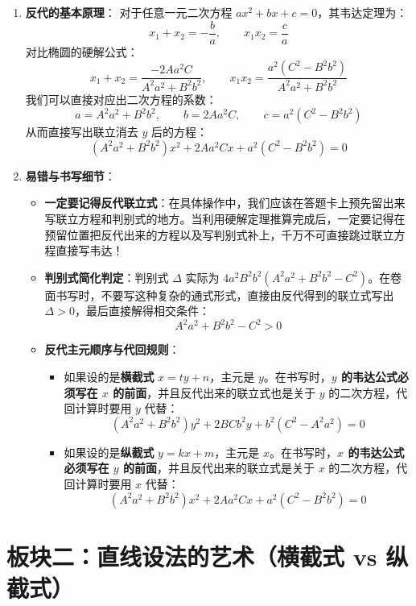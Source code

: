 \documentclass[11pt,a4paper]{ctexart}
\begin{document}
\begin{enumerate}[label=\arabic*.]
  \item \textbf{反代的基本原理}：
        对于任意一元二次方程 $ax^2 + bx + c = 0$，其韦达定理为：
        \[ x_1 + x_2 = -\frac{b}{a},\qquad x_1x_2 = \frac{c}{a} \]
        对比椭圆的硬解公式：
        \[ x_1 + x_2 = \frac{-2Aa^2C}{A^2a^2 + B^2b^2},\qquad x_1x_2 = \frac{a^2(C^2 - B^2b^2)}{A^2a^2 + B^2b^2} \]
        我们可以直接对应出二次方程的系数：
        \[ a = A^2a^2 + B^2b^2,\qquad b = 2Aa^2C,\qquad c = a^2(C^2 - B^2b^2) \]
        从而直接写出联立消去 $y$ 后的方程：
        \[ (A^2a^2 + B^2b^2)x^2 + 2Aa^2Cx + a^2(C^2 - B^2b^2) = 0 \]
        
  \item \textbf{易错与书写细节}：
        \begin{itemize}
          \item \textbf{一定要记得反代联立式}：在具体操作中，我们应该在答题卡上预先留出来写联立方程和判别式的地方。当利用硬解定理推算完成后，一定要记得在预留位置把反代出来的方程以及写判别式补上，千万不可直接跳过联立方程直接写韦达！
          \item \textbf{判别式简化判定}：判别式 $\Delta$ 实际为 $4a^2B^2b^2(A^2a^2 + B^2b^2 - C^2)$。在卷面书写时，不要写这种复杂的通式形式，直接由反代得到的联立式写出 $\Delta > 0$，最后直接解得相交条件：
                \[ A^2a^2 + B^2b^2 - C^2 > 0 \]
          \item \textbf{反代主元顺序与代回规则}：
                \begin{itemize}
                  \item 如果设的是\textbf{横截式} $x=ty+n$，主元是 $y$。在书写时，\textbf{$y$ 的韦达公式必须写在 $x$ 的前面}，并且反代出来的联立式也是关于 $y$ 的二次方程，代回计算时要用 $y$ 代替：
                        \[ (A^2a^2 + B^2b^2)y^2 + 2BCb^2y + b^2(C^2 - A^2a^2) = 0 \]
                  \item 如果设的是\textbf{纵截式} $y=kx+m$，主元是 $x$。在书写时，\textbf{$x$ 的韦达公式必须写在 $y$ 的前面}，并且反代出来的联立式是关于 $x$ 的二次方程，代回计算时要用 $x$ 代替：
                        \[ (A^2a^2 + B^2b^2)x^2 + 2Aa^2Cx + a^2(C^2 - B^2b^2) = 0 \]
                \end{itemize}
        \end{itemize}
\end{enumerate}

\newpage

\section{板块二：直线设法的艺术（横截式 vs 纵截式）}
\end{document}
